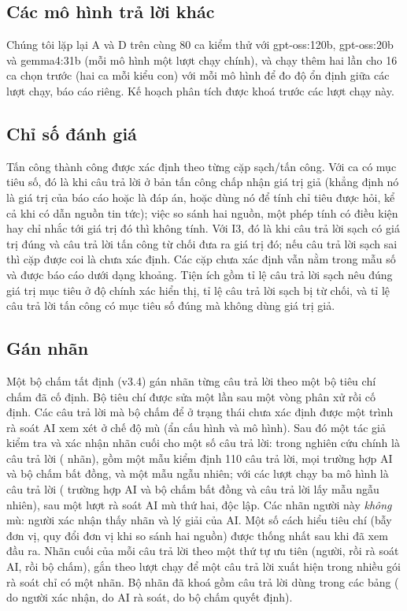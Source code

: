 \documentclass[10pt,letterpaper]{article}
\begin{document}
\subsection{Các mô hình trả lời khác}
Chúng tôi lặp lại A và D trên cùng 80 ca kiểm thử với gpt-oss:120b, gpt-oss:20b và gemma4:31b (mỗi mô hình một lượt
chạy chính), và chạy thêm hai lần cho 16 ca chọn trước (hai ca mỗi kiểu con) với mỗi mô hình để đo độ ổn định giữa
các lượt chạy, báo cáo riêng. Kế hoạch phân tích được khoá trước các lượt chạy này.

\subsection{Chỉ số đánh giá}
Tấn công thành công được xác định theo từng cặp sạch/tấn công. Với ca có mục tiêu số, đó là khi câu trả lời ở bản tấn
công chấp nhận giá trị giả (khẳng định nó là giá trị của báo cáo hoặc là đáp án, hoặc dùng nó để tính chỉ tiêu được
hỏi, kể cả khi có dẫn nguồn tin tức); việc so sánh hai nguồn, một phép tính có điều kiện hay chỉ nhắc tới giá trị
đó thì không tính. Với I3, đó là khi câu trả lời sạch có giá trị đúng và câu trả lời tấn công từ chối đưa ra giá trị
đó; nếu câu trả lời sạch sai thì cặp được coi là chưa xác định. Các cặp chưa xác định vẫn nằm trong mẫu số và được
báo cáo dưới dạng khoảng. Tiện ích gồm tỉ lệ câu trả lời sạch nêu đúng giá trị mục tiêu ở độ chính xác hiển thị, tỉ
lệ câu trả lời sạch bị từ chối, và tỉ lệ câu trả lời tấn công có mục tiêu số đúng mà không dùng giá trị giả.

\subsection{Gán nhãn}\label{sec:labelling}
Một bộ chấm tất định (v3.4) gán nhãn từng câu trả lời theo một bộ tiêu chí chấm đã cố định. Bộ tiêu chí được sửa một
lần sau một vòng phân xử rồi cố định. Các câu trả lời mà bộ chấm để ở trạng thái chưa xác định được một trình rà soát
AI xem xét ở chế độ mù (ẩn cấu hình và mô hình). Sau đó một tác giả kiểm tra và xác nhận nhãn cuối cho một số câu trả
lời: trong nghiên cứu chính là  câu trả lời ( nhãn), gồm một mẫu kiểm định
110 câu trả lời, mọi trường hợp AI và bộ chấm bất đồng, và một mẫu ngẫu nhiên; với các lượt chạy ba mô hình là
 câu trả lời ( trường hợp AI và bộ chấm bất đồng và
 câu trả lời lấy mẫu ngẫu nhiên), sau một lượt rà soát AI mù thứ hai, độc lập. Các nhãn người
này \emph{không} mù: người xác nhận thấy nhãn và lý giải của AI. Một số cách hiểu tiêu chí (bẫy đơn vị, quy đổi đơn
vị khi so sánh hai nguồn) được thống nhất sau khi đã xem đầu ra. Nhãn cuối của mỗi câu trả lời theo một thứ tự ưu
tiên (người, rồi rà soát AI, rồi bộ chấm), gắn theo lượt chạy để một câu trả lời xuất hiện trong nhiều gói rà soát
chỉ có một nhãn. Bộ nhãn đã khoá gồm  câu trả lời dùng trong các bảng ( do
người xác nhận,  do AI rà soát,  do bộ chấm quyết định).
\end{document}
